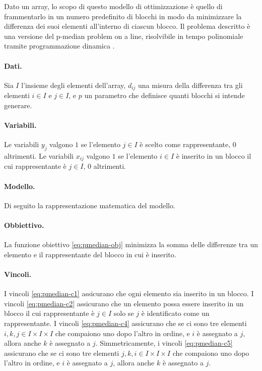 Dato un array, lo scopo di questo modello di ottimizzazione è quello di frammentarlo in un numero predefinito di blocchi in modo da minimizzare la differenza dei suoi elementi all'interno di ciascun blocco. Il problema descritto è una versione del p-median problem on a line, risolvibile in tempo polinomiale tramite programmazione dinamica \cite{HASSIN1991395}.

\paragraph{Dati.} Sia $I$ l'insieme degli elementi dell'array, $d_{ij}$ una misura della differenza tra gli elementi $i \in I$ e $j \in I$, e $p$ un parametro che definisce quanti blocchi si intende generare.

\paragraph{Variabili.} Le variabili $y_j$ valgono $1$ se l'elemento $j \in I$ è scelto come rappresentante, $0$ altrimenti. Le variabili $x_{ij}$ valgono $1$ se l'elemento $i \in I$ è inserito in un blocco il cui rappresentante è $j \in I$, $0$ altrimenti.

\paragraph{Modello.} Di seguito la rappresentazione matematica del modello.



\paragraph{Obbiettivo.} La funzione obiettivo \eqref{eq:pmedian-obj} minimizza la somma delle differenze tra un elemento e il rappresentante del blocco in cui è inserito.

\paragraph{Vincoli.} I vincoli \eqref{eq:pmedian-c1} assicurano che ogni elemento sia inserito in un blocco. I vincoli \eqref{eq:pmedian-c2} assicurano che un elemento possa essere inserito in un blocco il cui rappresentante è $j \in I$ solo se $j$ è identificato come un rappresentante. I vincoli \eqref{eq:pmedian-c4} assicurano che se ci sono tre elementi $i, k, j \in I \times I \times I$ che compaiono uno dopo l'altro in ordine, e $i$ è assegnato a $j$, allora anche $k$ è assegnato a $j$. Simmetricamente, i vincoli \eqref{eq:pmedian-c5} assicurano che se ci sono tre elementi $j, k, i \in I \times I \times I$ che compaiono uno dopo l'altro in ordine, e $i$ è assegnato a $j$, allora anche $k$ è assegnato a $j$.
